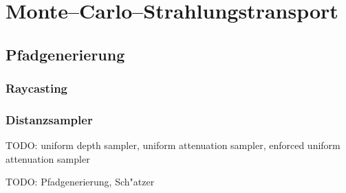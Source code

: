	\chapter{Monte--Carlo--Strahlungstransport}\label{sec:mc_radiativetransfer}
	\section{Pfadgenerierung}
	\subsection{Raycasting}
	\subsection{Distanzsampler}
	TODO: uniform depth sampler, uniform attenuation sampler, enforced uniform attenuation sampler
	
	TODO: Pfadgenerierung, Sch"atzer
	